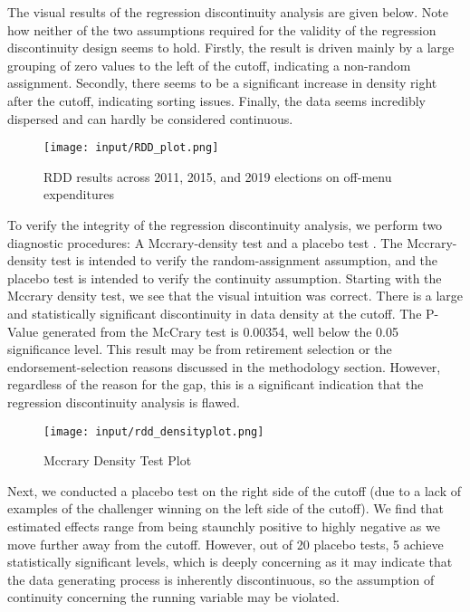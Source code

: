 The visual results of the regression discontinuity analysis are given below. 
Note how neither of the two assumptions required for the validity of the regression discontinuity design seems to hold. 
Firstly, the result is driven mainly by a large grouping of zero values to the left of the cutoff, indicating a non-random assignment. 
Secondly, there seems to be a significant increase in density right after the cutoff, indicating sorting issues. 
Finally, the data seems incredibly dispersed and can hardly be considered continuous. 

\begin{figure}[H]
    \centering
    \texttt{[image: input/RDD\_plot.png]}
        \caption{RDD results across 2011, 2015, and 2019 elections on off-menu expenditures}
\end{figure}

To verify the integrity of the regression discontinuity analysis, we perform two diagnostic procedures: A Mccrary-density test and a placebo test \cite{MCCRARY2008698}. 
The Mccrary-density test is intended to verify the random-assignment assumption, and the placebo test is intended to verify the continuity assumption. 
Starting with the Mccrary density test, we see that the visual intuition was correct. 
There is a large and statistically significant discontinuity in data density at the cutoff. 
The P-Value generated from the McCrary test is 0.00354, well below the 0.05 significance level. 
This result may be from retirement selection or the endorsement-selection reasons discussed in the methodology section. 
However, regardless of the reason for the gap, this is a significant indication that the regression discontinuity analysis is flawed.

\begin{figure}[H]
    \centering
    \texttt{[image: input/rdd\_densityplot.png]}
    \caption{Mccrary Density Test Plot}
\end{figure}

Next, we conducted a placebo test on the right side of the cutoff (due to a lack of examples of the challenger winning on the left side of the cutoff). 
We find that estimated effects range from being staunchly positive to highly negative as we move further away from the cutoff. 
However, out of 20 placebo tests, 5 achieve statistically significant levels, which is deeply concerning as it may indicate that the data generating process is inherently discontinuous, so the assumption of continuity concerning the running variable may be violated. 

